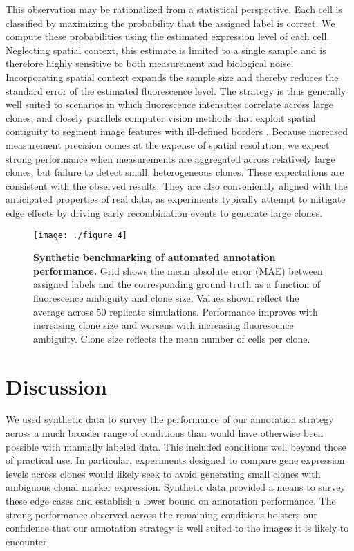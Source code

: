 This observation may be rationalized from a statistical perspective. Each cell is classified by maximizing the probability that the assigned label is correct. We compute these probabilities using the estimated expression level of each cell. Neglecting spatial context, this estimate is limited to a single sample and is therefore highly sensitive to both measurement and biological noise. Incorporating spatial context expands the sample size and thereby reduces the standard error of the estimated fluorescence level. The strategy is thus generally well suited to scenarios in which fluorescence intensities correlate across large clones, and closely parallels computer vision methods that exploit spatial contiguity to segment image features with ill-defined borders \cite{Nguyen2012}. Because increased measurement precision comes at the expense of spatial resolution, we expect strong performance when measurements are aggregated across relatively large clones, but failure to detect small, heterogeneous clones. These expectations are consistent with the observed results. They are also conveniently aligned with the anticipated properties of real data, as experiments typically attempt to mitigate edge effects by driving early recombination events to generate large clones.

\begin{figure}[t]
\centering
\texttt{[image: ./figure\_4]}
\caption[Synthetic benchmarking of automated annotation performance.]{\textbf{Synthetic benchmarking of automated annotation performance.} Grid shows the mean absolute error (MAE) between assigned labels and the corresponding ground truth as a function of fluorescence ambiguity and clone size. Values shown reflect the average across 50 replicate simulations. Performance improves with increasing clone size and worsens with increasing fluorescence ambiguity. Clone size reflects the mean number of cells per clone.}
\label{fig:clones:fig4}
\end{figure}

\section{Discussion}

We used synthetic data to survey the performance of our annotation strategy across a much broader range of conditions than would have otherwise been possible with manually labeled data. This included conditions well beyond those of practical use. In particular, experiments designed to compare gene expression levels across clones would likely seek to avoid generating small clones with ambiguous clonal marker expression. Synthetic data provided a means to survey these edge cases and establish a lower bound on annotation performance. The strong performance observed across the remaining conditions bolsters our confidence that our annotation strategy is well suited to the images it is likely to encounter.

